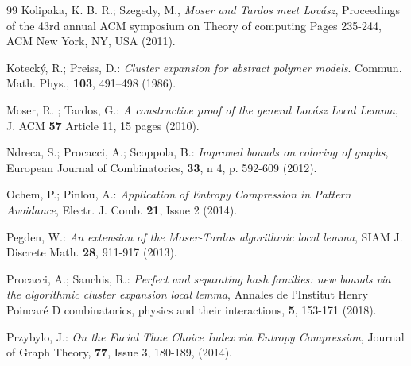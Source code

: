 \documentclass[11pt]{article}
\begin{document}
\begin{thebibliography}{99}
 Kolipaka, K. B. R.; Szegedy, M., {\it Moser and Tardos meet Lov\'asz}, Proceedings of the 43rd annual ACM symposium on Theory of computing
Pages 235-244, ACM New York, NY, USA (2011).
%

 Koteck\'y, R.;  Preiss, D.: {\it Cluster
expansion for abstract polymer models}.  {Commun. Math. Phys.},
{\bf 103}, 491--498 (1986).



%

 {Moser, R. ; Tardos, G.: {\it A constructive proof of the general Lov\'asz Local
Lemma}, J. ACM {\bf 57} Article 11, 15 pages  (2010).}

 Ndreca, S.;  Procacci, A.; Scoppola, B.: {\it
Improved bounds on coloring of graphs},  European Journal of
Combinatorics, {\bf 33}, n 4, p. 592-609 (2012).

 Ochem, P.; Pinlou, A.: {\it Application of Entropy Compression in Pattern Avoidance},
Electr.  J. Comb. {\bf  21}, Issue 2 (2014).

 Pegden, W.: {\it An extension of the Moser-Tardos algorithmic local lemma},  SIAM J. Discrete Math. {\bf 28}, 911-917 (2013).

 Procacci, A.; Sanchis, R.: {\it Perfect and separating hash families: new bounds via the algorithmic cluster expansion local lemma},
Annales  de l'Institut Henry Poincar\'e D  combinatorics, physics and their interactions, {\bf 5}, 153-171 (2018).

 Przybylo, J.: {\it On the Facial Thue Choice Index via Entropy Compression}, Journal of Graph Theory, {\bf 77}, Issue 3, 180-189, (2014).


\end{thebibliography}
\end{document}
